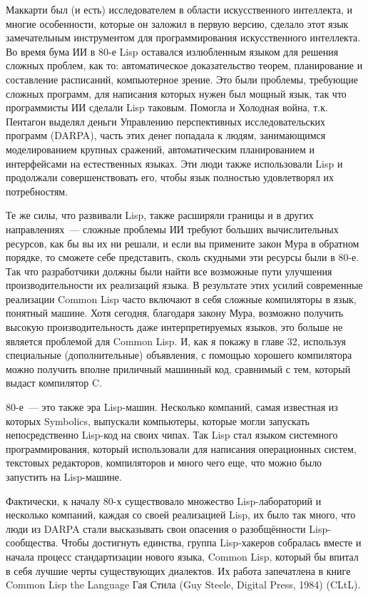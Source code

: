 Маккарти был (и есть) исследователем в области искусственного интеллекта, и многие
особенности, которые он заложил в первую версию, сделало этот язык замечательным
инструментом для программирования искусственного интеллекта. Во время бума ИИ в 80-е Lisp
оставался излюбленным языком для решения сложных проблем, как то: автоматическое
доказательство теорем, планирование и составление расписаний, компьютерное зрение. Это
были проблемы, требующие сложных программ, для написания которых нужен был мощный язык,
так что программисты ИИ сделали Lisp таковым. Помогла и Холодная война, т.к. Пентагон
выделял деньги Управлению перспективных исследовательских программ (DARPA), часть этих
денег попадала к людям, занимающимся моделированием крупных сражений, автоматическим
планированием и интерфейсами на естественных языках. Эти люди также использовали Lisp и
продолжали совершенствовать его, чтобы язык полностью удовлетворял их потребностям.

Те же силы, что развивали Lisp, также расширяли границы и в других направлениях~---
сложные проблемы ИИ требуют больших вычислительных ресурсов, как бы вы их ни решали, и
если вы примените закон Мура в обратном порядке, то сможете себе представить, сколь
скудными эти ресурсы были в 80-е. Так что разработчики должны были найти все возможные
пути улучшения производительности их реализаций языка. В результате этих усилий
современные реализации Common Lisp часто включают в себя сложные компиляторы в язык,
понятный машине. Хотя сегодня, благодаря закону Мура, возможно получить высокую
производительность даже интерпретируемых языков, это больше не является проблемой для
Common Lisp. И, как я покажу в главе 32, используя специальные (дополнительные)
объявления, с помощью хорошего компилятора можно получить вполне приличный машинный код,
сравнимый с тем, который выдаст компилятор C.

80-е~--- это также эра Lisp-машин. Несколько компаний, самая известная из которых
Symbolics, выпускали компьютеры, которые могли запускать непосредственно Lisp-код на своих
чипах. Так Lisp стал языком системного программирования, который использовали для
написания операционных систем, текстовых редакторов, компиляторов и много чего еще, что
можно было запустить на Lisp-машине.

Фактически, к началу 80-х существовало множество Lisp-лабораторий и несколько компаний,
каждая со своей реализацией Lisp, их было так много, что люди из DARPA стали высказывать
свои опасения о разобщённости Lisp-сообщества. Чтобы достигнуть единства, группа
Lisp-хакеров собралась вместе и начала процесс стандартизации нового языка, Common Lisp,
который бы впитал в себя лучшие черты существующих диалектов. Их работа запечатлена в
книге Common Lisp the Language Гая Стила (Guy Steele, Digital Press, 1984) (CLtL).

